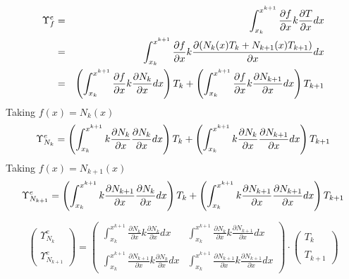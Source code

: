 \begin{eqnarray}
{\Upsilon}_f^e &=&
\int_{x_k}^{x^{k+1}} \frac{\partial f}{\partial x} k \frac{\partial T}{\partial x} dx \nonumber\\
&=&
\int_{x_k}^{x^{k+1}} \frac{\partial f}{\partial x} k \frac{\partial  (N_{k}(x) T_k + N_{k+1}(x) T_{k+1} ) }{\partial x} dx  \nonumber\\
&=&
\left( \int_{x_k}^{x^{k+1}} \frac{\partial f}{\partial x}  k \frac{\partial  N_{k} } {\partial x}  dx \right)  T_k 
+ \left( \int_{x_k}^{x^{k+1}} \frac{\partial f}{\partial x}  k \frac{\partial  N_{k+1} } {\partial x} dx \right) T_{k+1}  \nonumber
\end{eqnarray}
Taking $f(x)=N_k(x)$ 
\[
{\Upsilon}_{N_k}^e=
\left( \int_{x_k}^{x^{k+1}} k\frac{\partial N_k}{\partial x}  \frac{\partial  N_{k} } {\partial x}  dx \right)  T_k 
+ \left( \int_{x_k}^{x^{k+1}} k \frac{\partial N_k}{\partial x}  \frac{\partial  N_{k+1} } {\partial x} dx \right) T_{k+1}  \nonumber
\]
Taking $f(x)=N_{k+1}(x)$ 
\[
{\Upsilon}_{N_{k+1}}^e=
\left( \int_{x_k}^{x^{k+1}} k\frac{\partial N_{k+1}}{\partial x}  \frac{\partial  N_{k} } {\partial x}  dx \right)  T_k 
+ \left( \int_{x_k}^{x^{k+1}}  k\frac{\partial N_{k+1}}{\partial x}  \frac{\partial  N_{k+1} } {\partial x} dx \right) T_{k+1}  \nonumber
\]


\[
\left(
\begin{array}{cc}
 {\Upsilon}_{N_k}^e \\ \\ {\Upsilon}_{N_{k+1}}^e
\end{array}
\right)
=
\left(
\begin{array}{cc}
\int_{x_k}^{x^{k+1}} \frac{\partial N_k}{\partial x} k \frac{\partial  N_{k} } {\partial x}  dx & 
\int_{x_k}^{x^{k+1}} \frac{\partial N_k}{\partial x} k \frac{\partial  N_{k+1} } {\partial x} dx 
\\ \\
\int_{x_k}^{x^{k+1}} \frac{\partial N_{k+1}}{\partial x} k \frac{\partial  N_{k} } {\partial x}  dx & 
\int_{x_k}^{x^{k+1}} \frac{\partial N_{k+1}}{\partial x} k \frac{\partial  N_{k+1} } {\partial x} dx 
\end{array}
\right)
\cdot
\left(
\begin{array}{c}
T_k \\ \\ T_{k+1}
\end{array}
\right)
\]

